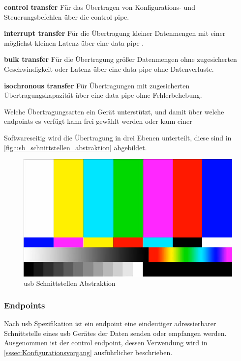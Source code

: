 \begin{compactitem}
    \item \textbf{control transfer} Für das Übertragen von Konfigurations- und Steuerungsbefehlen über die control pipe.
    \item \textbf{interrupt transfer} Für die Übertragung kleiner Datenmengen mit einer möglichst kleinen Latenz über eine data pipe .
    \item \textbf{bulk transfer} Für die Übertragung grö{\ss}er Datenmengen ohne zugesicherten Geschwindigkeit oder Latenz über eine data pipe ohne Datenverluste.
    \item \textbf{isochronous transfer}  Für Übertragungen mit zugesicherten Übertragungskapazität über eine data pipe ohne Fehlerbehebung.
\end{compactitem}
Welche Übertragungsarten ein Gerät unterstützt, und damit über welche endpoints es verfügt kann frei gewählt werden oder kann einer %

Softwareseitig wird die Übertragung in drei Ebenen unterteilt, diese sind in \autoref{fig:usb_schnittstellen_abstraktion} abgebildet.
\begin{figure}[h]
    \centering
    \includegraphics[width=.75\textwidth,keepaspectratio=true]{content/images/usb_spec_figure_5_2.PNG}
    \caption{\acrshort{usb} Schnittstellen Abstraktion \cite[Figure~5-2]{usb_developer_guide}}
    \label{fig:usb_schnittstellen_abstraktion}
\end{figure}



\subsubsection{Endpoints} \label{sssec:endpoints}
Nach  \acrshort{usb} Spezifikation ist ein endpoint eine eindeutiger adressierbarer Schnittstelle eines \acrshort{usb} Gerätes der Daten senden oder empfangen werden. Ausgenommen ist der control endpoint, dessen Verwendung wird in \autoref{sssec:Konfigurationsvorgang} ausführlicher beschrieben.

